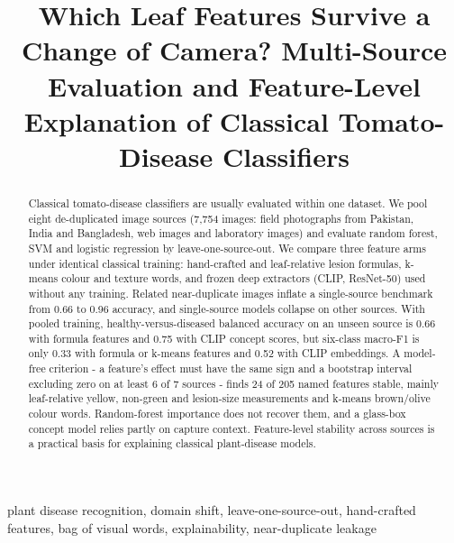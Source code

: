 \documentclass[conference]{IEEEtran}
\begin{document}
\title{Which Leaf Features Survive a Change of Camera? Multi-Source Evaluation and Feature-Level Explanation of Classical Tomato-Disease Classifiers}
\author{ \and {} \and {}}
\maketitle
\begin{abstract}
Classical tomato-disease classifiers are usually evaluated within one dataset. We pool eight de-duplicated image sources (7,754 images: field photographs from Pakistan, India and Bangladesh, web images and laboratory images) and evaluate random forest, SVM and logistic regression by leave-one-source-out. We compare three feature arms under identical classical training: hand-crafted and leaf-relative lesion formulas, k-means colour and texture words, and frozen deep extractors (CLIP, ResNet-50) used without any training. Related near-duplicate images inflate a single-source benchmark from 0.66 to 0.96 accuracy, and single-source models collapse on other sources. With pooled training, healthy-versus-diseased balanced accuracy on an unseen source is 0.66 with formula features and 0.75 with CLIP concept scores, but six-class macro-F1 is only 0.33 with formula or k-means features and 0.52 with CLIP embeddings. A model-free criterion - a feature's effect must have the same sign and a bootstrap interval excluding zero on at least 6 of 7 sources - finds 24 of 205 named features stable, mainly leaf-relative yellow, non-green and lesion-size measurements and k-means brown/olive colour words. Random-forest importance does not recover them, and a glass-box concept model relies partly on capture context. Feature-level stability across sources is a practical basis for explaining classical plant-disease models.
\end{abstract}
\begin{IEEEkeywords}
plant disease recognition, domain shift, leave-one-source-out, hand-crafted features, bag of visual words, explainability, near-duplicate leakage
\end{IEEEkeywords}
\end{document}

